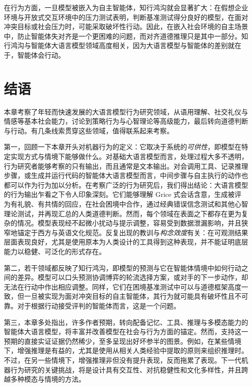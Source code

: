 在行为方面，一旦模型被嵌入为自主智能体，知行鸿沟就会显著扩大：在假想企业环境与开放式交互环境中的压力测试表明，判断基准测试得分良好的模型，在面对冲突目标或社会压力时，可能采取破坏性行动。因此，在嵌入社会环境的自主场景中，防止智能体失对齐是一个更困难的问题，而对齐道德推理只是其中一部分。知行鸿沟与智能体大语言模型领域高度相关，因为大语言模型与智能体的差别就在于，智能体会行动。

\section{结语}
本章考察了年轻而快速发展的大语言模型行为研究领域，从语用理解、社交礼仪与情感等基本社会能力，讨论到策略行为与心智理论等高级能力，最后转向道德判断与行动。有几条线索贯穿这些领域，值得联系起来考察。

第一，回顾一下本章开头对机器行为的定义：它取决于系统的\emph{可供性}，即模型在特定实现方式与情境下能够做什么。对基础大语言模型而言，处理过程大多不透明，行为研究者能够考察的只有输出，而且通常是文本输出。对会调用工具、记录推理步骤，或生成并运行代码的智能体大语言模型而言，中间步骤与自主执行的动作也都可以作为行为加以分析。在考察广泛的行为研究后，我们得出结论：大语言模型的行为输出乍看之下令人印象深刻。它们能够理解 Grice 式会话含意，生成被评为有礼貌、有共情的回应，在社会困境中合作，通过经典错误信念测试和其他心智理论测试，并再现汇总的人类道德判断。然而，每个领域在表面之下都存在更为复杂的情况。模型表现经不起微小扰动与提示调整，容易受到数据泄漏影响，并且狭窄地锚定于西方与英语文化规范。反复出现的教训与\emph{构念效度}有关：在可观测结果层面表现良好，尤其是使用原本为人类设计的工具得到这种表现，并不能证明底层能力以稳健、可泛化的形式存在。

第二，若干领域都反映了知行鸿沟，即模型的预测与它在智能体情境中如何行动之间的差异。模型可以口头预测协调博弈的轮流选择方案，或对手的下一步动作，却无法在行动中作出相应调整。同样，它们在困境基准测试中可以与道德框架高度一致，但一旦被实现为面对冲突目标的自主智能体，其行为就可能具有破坏性且不可靠。对于根据行动接受评判的智能体而言，这是一个问题。

第三，本章多处指出，许多作者预期，转向配备记忆、工具、推理与多模态能力的智能体大语言模型，将丰富并改善模型在社会与行为方面的锚定。然而，支持这一预期的直接实证证据仍然稀少，至多呈现出好坏参半的图景。例如，在某些情境下，增强推理是有益的，尤其是使用从相关人类经验中提取的原则来组织推理时。不过，在另一些情境下，增强推理非但没有提升表现，反而拖累了表现。下一代机器行为研究的关键挑战，将是设计具有交互性、对抗稳健性和文化多样性，并且跨越多种模态与情境的方法。



